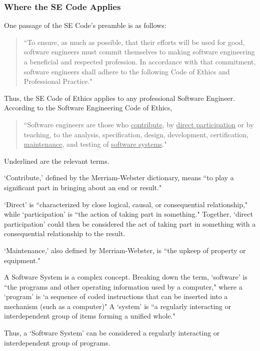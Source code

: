 \documentclass[12pt]{article}
\begin{document}
\begin{multicols}{2}
\subsubsection{Where the SE Code Applies}
One passage of the SE Code's preamble is as follows:
\begin{quote}
``To ensure, as much as possible, that their efforts will be used for good, software engineers must commit themselves to making software engineering a beneficial and respected profession. In accordance with that commitment, software engineers shall adhere to the following Code of Ethics and Professional Practice."\cite{SE-code}
\end{quote}
Thus, the SE Code of Ethics applies to any professional Software Engineer.
According to the Software Engineering Code of Ethics, \begin{quote}``Software engineers are those who \underline{contribute}, by \underline{direct participation} or by teaching, to the analysis, specification, design, development, certification, \underline{maintenance}, and testing of \underline{software systems}."\cite{SE-code}\end{quote}

Underlined are the relevant terms.

`Contribute,' defined by the Merriam-Webster dictionary, means ``to play a significant part in bringing about an end or result."\cite{webster}

`Direct' is ``characterized by close logical, causal, or consequential relationship," while `participation' is ``the action of taking part in something."\cite{webster, oxford} Together, `direct participation' could then be considered the act of taking part in something with a consequential relationship to the result.

`Maintenance,' also defined by Merriam-Webster, is ``the upkeep of property or equipment."\cite{webster}

A Software System is a complex concept. Breaking down the term, `software' is ``the programs and other operating information used by a computer," where a `program' is `a sequence of coded instructions that can be inserted into a mechanism (such as a computer)"\cite{oxford, webster} A `system' is ``a regularly interacting or interdependent group of items forming a unified whole."\cite{webster}

Thus, a `Software System' can be considered a regularly interacting or interdependent group of programs.


\end{multicols}
\end{document}
